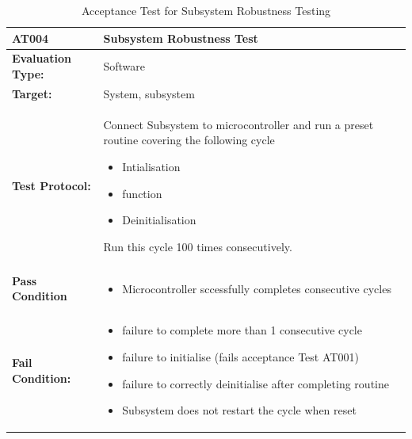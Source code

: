 \begin{table}[H]
    \centering
    \caption{Acceptance Test for Subsystem Robustness Testing}
    \begin{tabular}{|m{}|m{}|}
    \hline
   
   \textbf{AT004 }& \textbf{Subsystem Robustness Test} \\
     \hline
    \textbf{Evaluation Type:} & Software \\
     \hline
    \textbf{Target: } & System, subsystem \\
    \hline
    \textbf{Test Protocol:} & Connect Subsystem to microcontroller and run a preset routine covering the following cycle \begin{itemize}
        \item Intialisation
        \item function
        \item Deinitialisation
    \end{itemize} Run this cycle 100 times consecutively.\\
    \hline
    \textbf{Pass Condition} & \vspace{5pt} \begin{itemize}
        \item Microcontroller sccessfully completes consecutive cycles
    \end{itemize} \\
    \hline
    \textbf{Fail Condition:} & \vspace{5pt} \begin{itemize}
        \item  failure to complete more than 1 consecutive cycle
        \item failure to initialise (fails acceptance Test AT001)
        \item failure to correctly deinitialise after completing routine
        \item Subsystem does not restart the cycle when reset
        \end{itemize}\\
        \hline
    \end{tabular}

    \label{tab:AT004}
\end{table}

